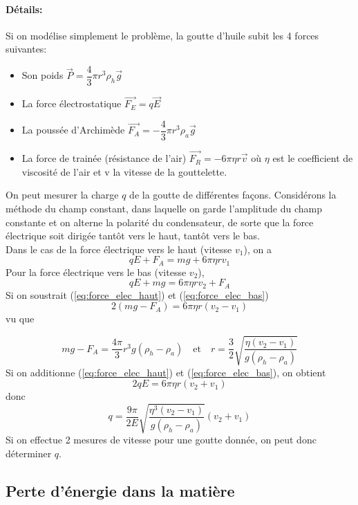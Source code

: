 \paragraph{Détails:} Si on modélise simplement le problème, la goutte d'huile subit les 4 forces suivantes: 
\begin{itemize}
    \item Son poids $\Vec{P}=\dfrac{4}{3}\pi r^3 \rho_h\Vec{g}$
    \item La force électrostatique $\Vec{F_E}=q\Vec{E}$
    \item La poussée d'Archimède $\Vec{F_A}=-\dfrac{4}{3}\pi r^3 \rho_a \Vec{g}$
    \item La force de trainée (résistance de l'air) $\Vec{F_R}=-6\pi\eta r\Vec{v}$ où $\eta$ est le coefficient de viscosité de l'air et v la vitesse de la gouttelette. 
\end{itemize}
On peut mesurer la charge $q$ de la goutte de différentes façons. Considérons la méthode du champ constant, dans laquelle on garde l'amplitude du champ constante et on alterne la polarité du condensateur, de sorte que la force électrique soit dirigée tantôt vers le haut, tantôt vers le bas. \\[0,2cm]
Dans le cas de la force électrique vers le haut (vitesse $v_1$), on a 
\begin{equation}
    qE+F_A = mg+6\pi\eta rv_1
    \label{eq:force_elec_haut}
\end{equation}
    Pour la force électrique vers le bas (vitesse $v_2$),
\begin{equation}
    qE+mg = 6\pi\eta rv_2 + F_A
    \label{eq:force_elec_bas}
\end{equation}
Si on soustrait (\ref{eq:force_elec_haut}) et (\ref{eq:force_elec_bas}) 
\[
    2(mg-F_A)=6\pi\eta r(v_2-v_1)
\]
vu que 

\[
mg-F_A=\dfrac{4\pi}{3}r^3g(\rho_h-\rho_a)\quad\text{et}\quad
r=\dfrac{3}{2}\sqrt{\dfrac{\eta(v_2-v_1)}{g(\rho_h-\rho_a)}}
\]
Si on additionne (\ref{eq:force_elec_haut}) et (\ref{eq:force_elec_bas}), on obtient
\[
    2qE=6\pi\eta r(v_2+v_1)
\]
donc 
\[
    q=\dfrac{9\pi}{2E}\sqrt{\dfrac{\eta^3(v_2-v_1)}{g(\rho_h-\rho_a)}}(v_2+v_1)
\]
Si on effectue 2 mesures de vitesse pour une goutte donnée, on peut donc déterminer $q$. 

\subsection{Perte d'énergie dans la matière}

